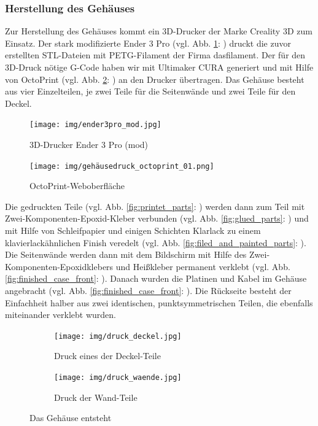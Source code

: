 \subsubsection{Herstellung des Gehäuses}\label{hw_case_herstellung}
Zur Herstellung des Gehäuses kommt ein 3D-Drucker der Marke Creality 3D zum Einsatz. 
Der stark modifizierte Ender 3 Pro (vgl. Abb. \ref{fig:ender3}: ) druckt die zuvor erstellten STL-Dateien mit PETG-Filament der Firma dasfilament. 
Der für den 3D-Druck nötige G-Code haben wir mit Ultimaker CURA generiert und mit Hilfe von OctoPrint (vgl. Abb. \ref{fig:octoprint}: ) an den Drucker übertragen. Das Gehäuse besteht aus vier Einzelteilen, je zwei Teile für die Seitenwände und zwei Teile für den Deckel.\par
\begin{figure}[H]
	\begin{center}
	\texttt{[image: img/ender3pro\_mod.jpg]}
	\end{center}
	\caption[3D-Drucker Ender 3 Pro (mod)]{3D-Drucker Ender 3 Pro (mod)}
	\label{fig:ender3}
\end{figure}
\begin{figure}[H]
	\texttt{[image: img/gehäusedruck\_octoprint\_01.png]}
	\caption[OctoPrint-Weboberfläche]{OctoPrint-Weboberfläche}
	\label{fig:octoprint}
\end{figure}
\noindent Die gedruckten Teile (vgl. Abb. \ref{fig:printet_parts}: ) werden dann zum Teil mit Zwei-Komponenten-Epoxid-Kleber verbunden (vgl. Abb. \ref{fig:glued_parts}: ) und mit Hilfe von Schleifpapier und einigen Schichten Klarlack zu einem klavierlackähnlichen Finish veredelt (vgl. Abb. \ref{fig:filed_and_painted_parts}: ).\\ 
\noindent Die Seitenwände werden dann mit dem Bildschirm mit Hilfe des Zwei-Komponenten-Epoxidklebers und Heißkleber permanent verklebt (vgl. Abb. \ref{fig:finished_case_front}: ).
Danach wurden die Platinen und Kabel im Gehäuse angebracht (vgl. Abb. \ref{fig:finished_case_front}: ). 
Die Rückseite besteht der Einfachheit halber aus zwei identischen, punktsymmetrischen Teilen, die ebenfalls miteinander verklebt wurden.\par
\begin{figure}[H]
	\begin{subfigure}[b]{0.5\linewidth}
		\centering
		\texttt{[image: img/druck\_deckel.jpg]}
		\caption[Druck eines der Deckel-Teile]{Druck eines der Deckel-Teile}
	\end{subfigure}
	\begin{subfigure}[b]{0.5\linewidth}
		\texttt{[image: img/druck\_waende.jpg]}
		\caption[Druck der Wand-Teile]{Druck der Wand-Teile}
	\end{subfigure}
	\caption[Das Gehäuse entsteht]{Das Gehäuse entsteht}
	\label{fig:printing_parts}
\end{figure}
